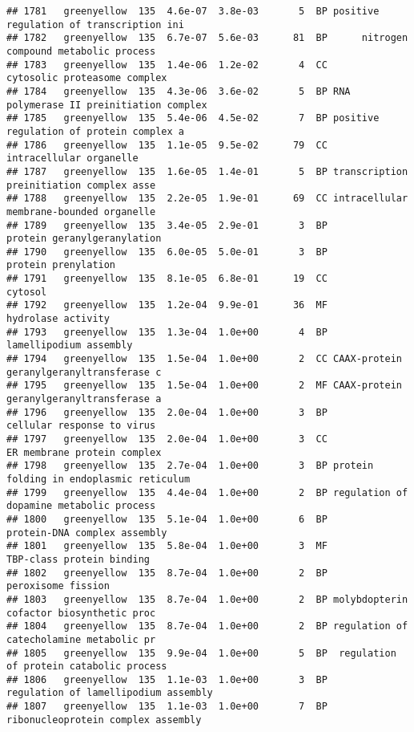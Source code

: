 \documentclass[]{article}
\begin{document}
\begin{verbatim}
## 1781   greenyellow  135  4.6e-07  3.8e-03       5  BP positive regulation of transcription ini
## 1782   greenyellow  135  6.7e-07  5.6e-03      81  BP      nitrogen compound metabolic process
## 1783   greenyellow  135  1.4e-06  1.2e-02       4  CC             cytosolic proteasome complex
## 1784   greenyellow  135  4.3e-06  3.6e-02       5  BP RNA polymerase II preinitiation complex 
## 1785   greenyellow  135  5.4e-06  4.5e-02       7  BP positive regulation of protein complex a
## 1786   greenyellow  135  1.1e-05  9.5e-02      79  CC                  intracellular organelle
## 1787   greenyellow  135  1.6e-05  1.4e-01       5  BP transcription preinitiation complex asse
## 1788   greenyellow  135  2.2e-05  1.9e-01      69  CC intracellular membrane-bounded organelle
## 1789   greenyellow  135  3.4e-05  2.9e-01       3  BP              protein geranylgeranylation
## 1790   greenyellow  135  6.0e-05  5.0e-01       3  BP                      protein prenylation
## 1791   greenyellow  135  8.1e-05  6.8e-01      19  CC                                  cytosol
## 1792   greenyellow  135  1.2e-04  9.9e-01      36  MF                       hydrolase activity
## 1793   greenyellow  135  1.3e-04  1.0e+00       4  BP                   lamellipodium assembly
## 1794   greenyellow  135  1.5e-04  1.0e+00       2  CC CAAX-protein geranylgeranyltransferase c
## 1795   greenyellow  135  1.5e-04  1.0e+00       2  MF CAAX-protein geranylgeranyltransferase a
## 1796   greenyellow  135  2.0e-04  1.0e+00       3  BP               cellular response to virus
## 1797   greenyellow  135  2.0e-04  1.0e+00       3  CC              ER membrane protein complex
## 1798   greenyellow  135  2.7e-04  1.0e+00       3  BP protein folding in endoplasmic reticulum
## 1799   greenyellow  135  4.4e-04  1.0e+00       2  BP regulation of dopamine metabolic process
## 1800   greenyellow  135  5.1e-04  1.0e+00       6  BP             protein-DNA complex assembly
## 1801   greenyellow  135  5.8e-04  1.0e+00       3  MF                TBP-class protein binding
## 1802   greenyellow  135  8.7e-04  1.0e+00       2  BP                       peroxisome fission
## 1803   greenyellow  135  8.7e-04  1.0e+00       2  BP molybdopterin cofactor biosynthetic proc
## 1804   greenyellow  135  8.7e-04  1.0e+00       2  BP regulation of catecholamine metabolic pr
## 1805   greenyellow  135  9.9e-04  1.0e+00       5  BP  regulation of protein catabolic process
## 1806   greenyellow  135  1.1e-03  1.0e+00       3  BP     regulation of lamellipodium assembly
## 1807   greenyellow  135  1.1e-03  1.0e+00       7  BP       ribonucleoprotein complex assembly

\end{verbatim}
\end{document}
